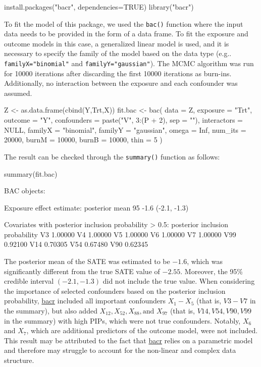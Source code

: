 \begin{example}
install.packages("bacr", dependencies=TRUE)
library("bacr")
\end{example}
To fit the model of this package, we used the \verb|bac()| function where the input data needs to be provided in the form of a data frame. To fit the exposure and outcome models in this case, a generalized linear model is used, and it is necessary to specify the family of the model based on the data type (e.g.. \verb|familyX="binomial"| and \verb|familyY="gaussian"|). The MCMC algorithm was run for 10000 iterations after discarding the first 10000 iterations as burn-ins. Additionally, no interaction between the exposure and each confounder was assumed.
\begin{example}
Z <- as.data.frame(cbind(Y,Trt,X))
fit.bac <- bac(
     data = Z, exposure = "Trt", outcome = "Y",
     confounders = paste("V", 3:(P + 2), sep = ""),
     interactors = NULL, familyX = "binomial", familyY = "gaussian",
     omega = Inf, num_its = 20000, burnM = 10000, burnB = 10000, thin = 5
   )
\end{example}
The result can be checked through the \verb|summary()| function as follows:
\begin{example}
summary(fit.bac)

BAC objects:

Exposure effect estimate:
        posterior mean     95%
                  -1.6               (-2.1, -1.3)


Covariates with posterior inclusion probability > 0.5:
    posterior inclusion probability
V3                          1.00000
V4                          1.00000
V5                          1.00000
V6                          1.00000
V7                          1.00000
V99                         0.92100
V14                         0.70305
V54                         0.67480
V90                         0.62345
\end{example}
The posterior mean of the SATE was estimated to be $-1.6$, which was significantly different from the true SATE value of $-2.55$. Moreover, the 95\% credible interval $(-2.1, -1.3)$ did not include the true value. When considering the importance of selected confounders based on the posterior inclusion probability, \href{https://CRAN.R-project.org/package=bacr}{bacr} included all important confounders $X_1-X_5$ (that is, $V3-V7$ in the summary), but also added $X_{12}, X_{52}, X_{88}, \text {and } X_{97}$ (that is, $V14, V54, V90, V99$ in the summary) with high PIPs, which were not true confounders. Notably, $X_6$ and $X_7$, which are additional predictors of the outcome model, were not included. This result may be attributed to the fact that \href{https://CRAN.R-project.org/package=bacr}{bacr} relies on a parametric model and therefore may struggle to account for the non-linear and complex data structure.



